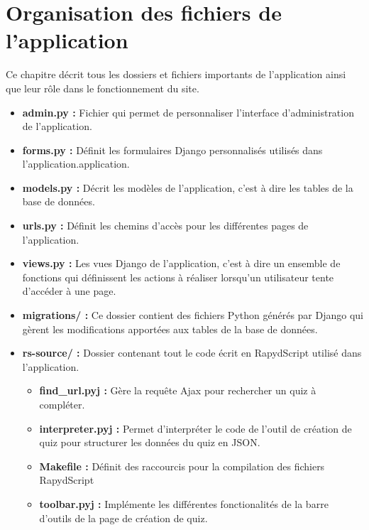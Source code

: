 \documentclass[a4,10pt,french]{sphinxmanual}
\begin{document}
\section{Organisation des fichiers de l'application}
\label{global:organisation-des-fichiers-de-l-application}
Ce chapitre décrit tous les dossiers et fichiers importants de l'application ainsi que leur rôle dans le fonctionnement du site.
\begin{itemize}
\item {} 
\textbf{admin.py :} Fichier qui permet de personnaliser l'interface d'administration de l'application.

\item {} 
\textbf{forms.py :} Définit les formulaires Django personnalisés utilisés dans l'application.application.

\item {} 
\textbf{models.py :} Décrit les modèles de l'application, c'est à dire les tables de la base de données.

\item {} 
\textbf{urls.py :} Définit les chemins d'accès pour les différentes pages de l'application.

\item {} 
\textbf{views.py :} Les vues Django de l'application, c'est à dire un ensemble de fonctions qui définissent les actions à réaliser lorsqu'un utilisateur tente d'accéder à une page.

\item {} 
\textbf{migrations/ :} Ce dossier contient des fichiers Python générés par Django qui gèrent les modifications apportées aux tables de la base de données.

\item {} 
\textbf{rs-source/ :} Dossier contenant tout le code écrit en RapydScript utilisé dans l'application.
\begin{itemize}
\item {} 
\textbf{find\_url.pyj :} Gère la requête Ajax pour rechercher un quiz à compléter.

\item {} 
\textbf{interpreter.pyj :} Permet d'interpréter le code de l'outil de création de quiz pour structurer les données du quiz en JSON.

\item {} 
\textbf{Makefile :} Définit des raccourcis pour la compilation des fichiers RapydScript

\item {} 
\textbf{toolbar.pyj :} Implémente les différentes fonctionalités de la barre d'outils de la page de création de quiz.


\end{itemize}
\end{itemize}
\end{document}
